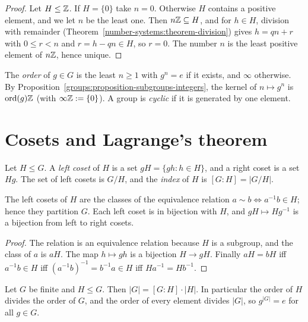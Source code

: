 \begin{proof}
Let $H \leq \mathbb{Z}$. If $H = \{0\}$ take $n = 0$. Otherwise $H$ contains a positive
element, and we let $n$ be the least one. Then $n\mathbb{Z} \subseteq H$, and for
$h \in H$, division with remainder (Theorem~\ref{number-systems:theorem-division})
gives $h = qn + r$ with $0 \leq r < n$ and $r = h - qn \in H$, so $r = 0$. The number
$n$ is the least positive element of $n\mathbb{Z}$, hence unique.
\end{proof}

\begin{definition}\label{groups:definition-order-element}
The \emph{order} of $g \in G$ is the least $n \geq 1$ with $g^n = e$ if it exists, and
$\infty$ otherwise. By Proposition~\ref{groups:proposition-subgroups-integers},
the kernel of $n \mapsto g^n$ is $\operatorname{ord}(g)\mathbb{Z}$ (with $\infty \mathbb{Z} := \{0\}$).
A group is \emph{cyclic} if it is generated by one element.
\end{definition}

\section{Cosets and Lagrange's theorem}\label{groups:section-cosets}

\begin{definition}\label{groups:definition-cosets}
Let $H \leq G$. A \emph{left coset} of $H$ is a set $gH = \{gh : h \in H\}$, and a
right coset is a set $Hg$. The set of left cosets is $G/H$, and the \emph{index}
of $H$ is $[G : H] = |G/H|$.
\end{definition}

\begin{lemma}\label{groups:lemma-cosets-partition}
The left cosets of $H$ are the classes of the equivalence relation
$a \sim b \iff a^{-1}b \in H$; hence they partition $G$. Each left coset is in
bijection with $H$, and $gH \mapsto Hg^{-1}$ is a bijection from left to right
cosets.
\end{lemma}

\begin{proof}
The relation is an equivalence relation because $H$ is a subgroup, and the class
of $a$ is $aH$. The map $h \mapsto gh$ is a bijection $H \to gH$. Finally $aH = bH$
iff $a^{-1}b \in H$ iff $(a^{-1}b)^{-1} = b^{-1}a \in H$ iff $Ha^{-1} = Hb^{-1}$.
\end{proof}

\begin{theorem}[Lagrange]\label{groups:theorem-lagrange}
Let $G$ be finite and $H \leq G$. Then $|G| = [G : H] \cdot |H|$. In particular the
order of $H$ divides the order of $G$, and the order of every element divides
$|G|$, so $g^{|G|} = e$ for all $g \in G$.
\end{theorem}

